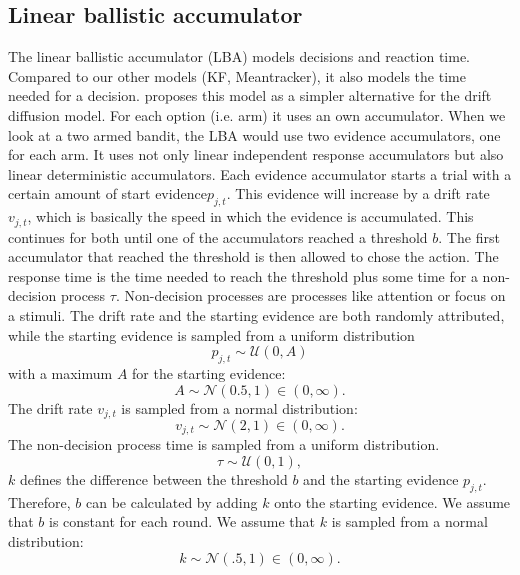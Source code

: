 \subsection{Linear ballistic accumulator}
The linear ballistic accumulator (LBA) models decisions and reaction time. Compared to our other models (KF, Meantracker), it also models the time needed for a decision. \citep{brown2008simplest} proposes this model as a simpler alternative for the drift diffusion model. For each option (i.e. arm) it uses an own accumulator. When we look at a two armed bandit, the LBA would use two evidence accumulators, one for each arm. It uses not only linear independent response accumulators but also linear deterministic accumulators. Each evidence accumulator starts a trial with a certain amount of start evidence$p_{j,t}$. This evidence will increase by a drift rate $v_{j,t}$, which is basically the speed in which the evidence is accumulated. This continues for both until one of the accumulators reached a threshold $b$. The first accumulator that reached the threshold is then allowed to chose the action. The response time is the time needed to reach the threshold plus some time for a non-decision process $\tau$. Non-decision processes are processes like attention or focus on a stimuli. 
The drift rate and the starting evidence are both randomly attributed, while the starting evidence is sampled from a uniform distribution
\begin{equation}
    p_{j,t} \sim \mathcal{U}(0,A)
\end{equation}
with a maximum $A$ for the starting evidence: 
\begin{equation}
    A \sim \mathcal{N}(0.5,1) \in (0, \infty).
\end{equation}
The drift rate $v_{j,t}$ is sampled from a normal distribution: 
\begin{equation}
    v_{j,t} \sim \mathcal{N}(2,1) \in (0, \infty).
\end{equation}
The non-decision process time is sampled from a uniform distribution. 
\begin{equation}
    \tau \sim \mathcal{U}(0,1),
\end{equation}
$k$ defines the difference between the threshold $b$ and the starting evidence $p_{j,t}$. Therefore, $b$ can be calculated by adding $k$ onto the starting evidence. We assume that $b$ is constant for each round. We assume that $k$ is sampled from a normal distribution:   
\begin{equation}
    k \sim \mathcal{N}(.5,1) \in (0, \infty).
\end{equation}
%